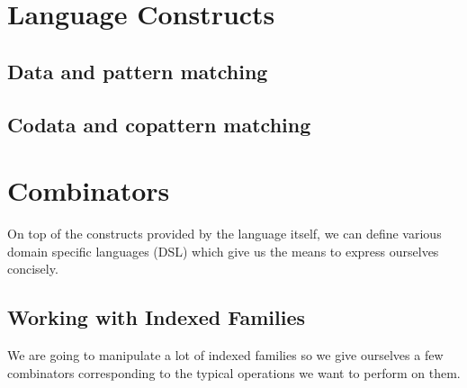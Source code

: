 \section{Language Constructs}

\subsection{Data and pattern matching}

\subsection{Codata and copattern matching}



\section{Combinators}

On top of the constructs provided by the language itself, we can define various
domain specific languages (DSL) which give us the means to express ourselves
concisely.

\subsection{Working with Indexed Families}
\label{indexed-combinators}

We are going to manipulate a lot of indexed families so we give ourselves a few
combinators corresponding to the typical operations we want to perform on them.

